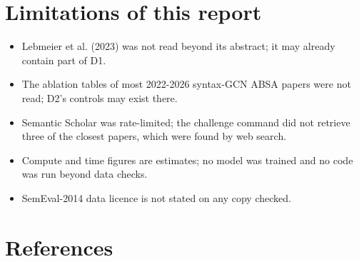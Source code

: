 \documentclass[11pt,a4paper]{article}
\begin{document}
\section{Limitations of this report}

\begin{itemize}
\item Lebmeier et al. (2023) was not read beyond its abstract; it may already contain part of D1.
\item The ablation tables of most 2022-2026 syntax-GCN ABSA papers were not read; D2's controls may exist there.
\item Semantic Scholar was rate-limited; the challenge command did not retrieve three of the closest papers, which were found by web search.
\item Compute and time figures are estimates; no model was trained and no code was run beyond data checks.
\item SemEval-2014 data licence is not stated on any copy checked.
\end{itemize}

\section{References}



\end{document}
